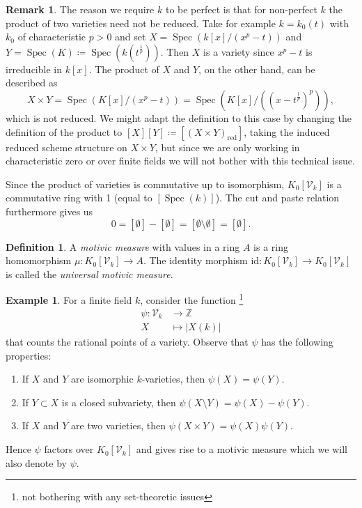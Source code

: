 \documentclass[11pt, a4paper, english, twoside]{article}
\theoremstyle{plain}
\theoremstyle{definition}
\newtheorem{definition}[theorem]{Definition}
\newtheorem{remark}[theorem]{Remark}
\newtheorem{example}[theorem]{Example}
\newcommand{\gring}[1][k]{K_0[\mathcal{V}_#1]}
\DeclareMathOperator{\Spec}{Spec}
\begin{document}
\begin{remark}
The reason we require $k$ to be perfect is that for non-perfect $k$ the product of two varieties need not be reduced. Take for example
$k = k_0(t)$ with $k_0$ of characteristic $p > 0$ and set $X = \Spec(k[x]/(x^p - t))$ and $Y = \Spec(K) \coloneqq \Spec(k(t^{\frac{1}{p}}))$. 
Then $X$ is a variety since $x^p - t$ is irreducible in $k[x]$. The product of $X$ and $Y$, on the other hand, can be described as
    \[
        X \times Y = \Spec(K[x]/(x^p - t)) = \Spec(K[x]/((x-t^{\frac{1}{p}})^p)),
    \]
which is not reduced. We might adapt the definition to this case by changing the definition of the product to 
$[X][Y] \coloneqq [(X \times Y)_{\text{red}}]$, taking the induced reduced scheme structure on $X \times Y$, but since we are only working
in characteristic zero or over finite fields we will not bother with this technical issue.
\end{remark}

Since the product of varieties is commutative up to isomorphism, $\gring$ is a commutative ring with 1 (equal to $[\Spec(k)]$). 
The cut and paste relation furthermore gives us
\[
    0 = [\emptyset] - [\emptyset] = [\emptyset \setminus \emptyset] = [\emptyset].
\]

\begin{definition}
A \emph{motivic measure} with values in a ring $A$ is a ring homomorphism $\mu \colon \gring \to A$. The identity morphism
    $\mathrm{id} \colon \gring \to \gring$ is called the \emph{universal motivic measure}.
\end{definition}
\begin{example}
    \label{countMeasure}
    For a finite field $k$, consider the function \footnote{not bothering with any set-theoretic issues} 
    \begin{align*}
        \psi \colon \mathcal{V}_k & \to   \mathbb{Z}\\
        X & \mapsto |X(k)|
    \end{align*}
    that counts the rational points of a variety.
    Observe that $\psi$ has the following properties:
    \begin{enumerate}
        \item If $X$ and $Y$ are isomorphic $k$-varieties, then $\psi(X) = \psi(Y)$.
        \item If $Y \subset X$ is a closed subvariety, then $\psi(X \setminus Y) = \psi(X) - \psi(Y)$.
        \item If $X$ and $Y$ are two varieties, then $\psi(X \times Y) = \psi(X)\psi(Y)$.
    \end{enumerate}
    Hence $\psi$ factors over $\gring[k]$ and gives rise to a motivic measure which we will also denote by $\psi$.
\end{example}
\end{document}
